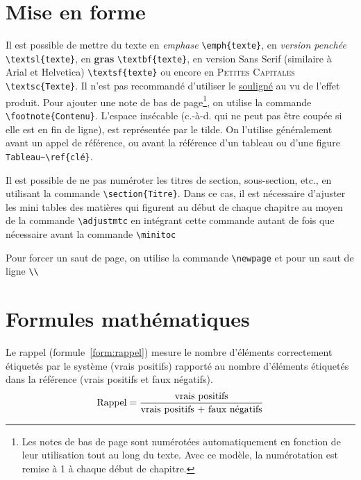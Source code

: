 
\section{Mise en forme}
Il est possible de mettre du texte en \emph{emphase}
\verb+\emph{texte}+, en \textsl{version penchée}
\verb+\textsl{texte}+, en \textbf{gras} \verb+\textbf{texte}+, en
version \textsf{Sans Serif} (similaire à Arial et Helvetica)
\verb+\textsf{texte}+ ou encore en \textsc{Petites Capitales}
\verb+\textsc{Texte}+. Il n'est pas recommandé d'utiliser le
\underline{souligné} au vu de l'effet produit. Pour ajouter une note
de bas de page\footnote{Les notes de bas de page sont numérotées
  automatiquement en fonction de leur utilisation tout au long du
  texte. Avec ce modèle, la numérotation est remise à 1 à chaque début
  de chapitre.}, on utilise la commande
\verb+\footnote{Contenu}+. L'espace insécable (c.-à-d. qui ne peut pas
être coupée si elle est en fin de ligne), est représentée par le
tilde. On l'utilise généralement avant un appel de référence, ou avant
la référence d'un tableau ou d'une figure \verb+Tableau~\ref{clé}+.

Il est possible de ne pas numéroter les titres de section,
sous-section, etc., en utilisant la commande
\verb+\section{Titre}+. Dans ce cas, il est nécessaire d'ajuster les
mini tables des matières qui figurent au début de chaque chapitre au
moyen de la commande \verb+\adjustmtc+ en intégrant cette commande
autant de fois que nécessaire avant la commande \verb+\minitoc+

Pour forcer un saut de page, on utilise la commande \verb+\newpage+ et
pour un saut de ligne \verb+\\+



\section{Formules mathématiques}
 Le rappel (formule~\ref{form:rappel}) mesure le nombre
d'éléments correctement étiquetés par le système (vrais positifs)
rapporté au nombre d'éléments étiquetés dans la référence (vrais
positifs et faux négatifs).
%
\begin{equation}
  \centering
  \text{Rappel} = {{\text{vrais positifs}}\over{\text{vrais positifs + faux négatifs}}}
  \label{form:rappel}
\end{equation}

